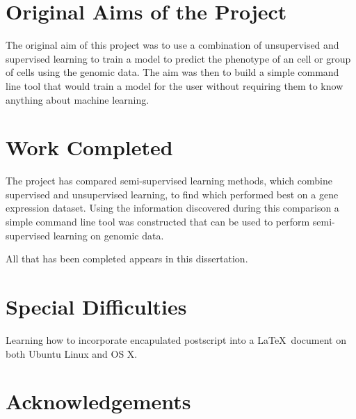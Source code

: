 \documentclass[12pt,a4paper,twoside,openany]{report}
\begin{document}
\section*{Original Aims of the Project}

The original aim of this project was to use a combination of unsupervised and supervised learning 
to train a model to predict the phenotype of an cell or group of cells using the genomic data.
The aim was then to build a simple command line tool that would train a model for the user without requiring them 
to know anything about machine learning.

\section*{Work Completed}

The project has compared semi-supervised learning methods, which combine supervised and unsupervised learning,
to find which performed best on a gene expression dataset. Using the information discovered during this comparison
a simple command line tool was constructed that can be used to perform semi-supervised learning on genomic data.

All that has been completed appears in this dissertation.

\section*{Special Difficulties}

Learning how to incorporate encapulated postscript into a \LaTeX\
document on both Ubuntu Linux and OS X.

\tableofcontents

\listoffigures

\newpage
\section*{Acknowledgements}


\pagestyle{headings}











\printbibliography


\end{document}
